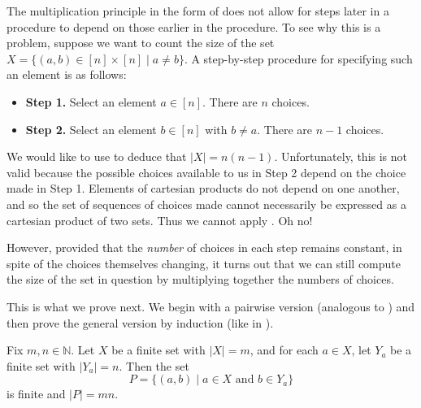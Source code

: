 The multiplication principle in the form of  does not allow for steps later in a procedure to depend on those earlier in the procedure. To see why this is a problem, suppose we want to count the size of the set $X = \{ (a,b) \in [n] \times [n] \mid a \ne b \}$. A step-by-step procedure for specifying such an element is as follows:
\begin{itemize}
\item \textbf{Step 1.} Select an element $a \in [n]$. There are $n$ choices.
\item \textbf{Step 2.} Select an element $b \in [n]$ with $b \ne a$. There are $n-1$ choices.
\end{itemize}
We would like to use  to deduce that $|X| = n(n-1)$. Unfortunately, this is not valid because the possible choices available to us in Step 2 depend on the choice made in Step 1. Elements of cartesian products do not depend on one another, and so the set of sequences of choices made cannot necessarily be expressed as a cartesian product of two sets. Thus we cannot apply . Oh no!

However, provided that the \textit{number} of choices in each step remains constant, in spite of the choices themselves changing, it turns out that we can still compute the size of the set in question by multiplying together the numbers of choices.

This is what we prove next. We begin with a pairwise version (analogous to ) and then prove the general version by induction (like in ).

\begin{lemma}
\label{lemMultiplicationPrinciplePairwise}
Fix $m,n \in \mathbb{N}$. Let $X$ be a finite set with $|X|=m$, and for each $a \in X$, let $Y_a$ be a finite set with $|Y_a|=n$. Then the set
\[ P = \{ (a, b) \mid a \in X \text{ and } b \in Y_a \} \]
is finite and $|P| = mn$.
\end{lemma}

